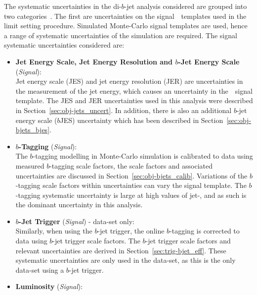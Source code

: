 The systematic uncertainties in the di-$b$-jet analysis considered are grouped into two categories~\cite{dibjet-ichep_conf}.
The first are
uncertainties on the signal~\mjj~templates used in the limit setting procedure.
Simulated Monte-Carlo signal templates are used,
hence a range of systematic uncertainties of the simulation are required.
The signal systematic uncertainties considered are:
\begin{itemize}[leftmargin=*]
\item\textbf{Jet Energy Scale, Jet Energy Resolution  and $b$-Jet Energy Scale} \hspace{1mm} (\textit{Signal}):\\
  Jet energy scale (JES) and jet energy resolution (JER) are uncertainties in the measurement of the jet energy,
  which causes an uncertainty in the~\mjj~signal template.
  The JES and JER uncertainties used in this analysis were described in Section~\ref{sec:obj-jets_uncert}.
  In addition, there is also an additional $b$-jet energy scale ($b$JES) uncertainty which
  has been described in Section~\ref{sec:obj-bjets_bjes}.
  \vspace{0.5em}
\item\textbf{$b$-Tagging} \hspace{1mm} (\textit{Signal}):\\
  The $b$-tagging modelling in Monte-Carlo simulation is calibrated to data using measured $b$-tagging scale factors,
  the scale factors and associated uncertainties are discussed in Section~\ref{sec:obj-bjets_calib}.
  Variations of the $b$-tagging scale factors within uncertainties can vary the signal template.
  The $b$-tagging systematic uncertainty is large at high values of jet-\pT, and as such is the dominant uncertainty in this analysis.
  \vspace{0.5em}
\item\textbf{$b$-Jet Trigger} \hspace{1mm} (\textit{Signal}) - \lm{} data-set only:\\
  Similarly, when using the $b$-jet trigger,
  the online $b$-tagging is corrected to data using $b$-jet trigger scale factors.
  The $b$-jet trigger scale factors and relevant uncertainties are derived in Section~\ref{sec:trig-bjet_eff}.
  These systematic uncertainties are only used in the \lm{} data-set, as this is the only data-set using a $b$-jet trigger.
  \vspace{0.5em}
\item\textbf{Luminosity} \hspace{1mm} (\textit{Signal}):\\

\end{itemize}
